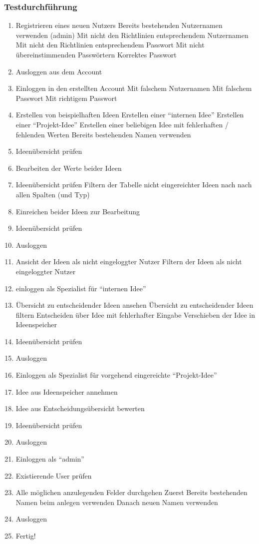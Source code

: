 \subsubsection*{Testdurchführung}
\begin{enumerate}
\item Registrieren eines neuen Nutzers
	\subitem Bereits bestehenden Nutzernamen verwenden (admin)
	\subitem Mit nicht den Richtlinien entsprechendem Nutzernamen
	\subitem Mit nicht den Richtlinien entsprechendem Passwort
	\subitem Mit nicht übereinstimmenden Passwörtern
	\subitem Korrektes Passwort
\item Ausloggen aus dem Account
\item Einloggen in den erstellten Account
	\subitem Mit falschem Nutzernamen
	\subitem Mit falschem Passwort
	\subitem Mit richtigem Passwort
\item Erstellen von beispielhaften Ideen
	\subitem Erstellen einer \enquote{internen Idee}
	\subitem Erstellen einer \enquote{Projekt-Idee}
	\subitem Erstellen einer beliebigen Idee mit fehlerhaften / fehlenden Werten
	\subitem Bereits bestehenden Namen verwenden
\item Ideenübersicht prüfen
\item Bearbeiten der Werte beider Ideen
\item Ideenübersicht prüfen
	\subitem Filtern der Tabelle nicht eingereichter Ideen nach nach allen Spalten (und Typ)
\item Einreichen beider Ideen zur Bearbeitung
\item Ideenübersicht prüfen
\item Ausloggen
\item Ansicht der Ideen als nicht eingeloggter Nutzer
	\subitem Filtern der Ideen als nicht eingeloggter Nutzer
\item einloggen als Spezialist für \enquote{internen Idee}
\item Übersicht zu entscheidender Ideen ansehen
	\subitem Übersicht zu entscheidender Ideen filtern
	\subitem Entscheiden über Idee mit fehlerhafter Eingabe
	\subitem Verschieben der Idee in Ideenspeicher
\item Ideenübersicht prüfen
\item Ausloggen
\item Einloggen als Spezialist für vorgehend eingereichte \enquote{Projekt-Idee}
\item Idee aus Ideenspeicher annehmen
\item Idee aus Entscheidungsübersicht bewerten
\item Ideenübersicht prüfen
\item Ausloggen
\item Einloggen als \enquote{admin}
\item Existierende User prüfen
\item Alle möglichen anzulegenden Felder durchgehen
 \subitem Zuerst Bereits bestehenden Namen beim anlegen verwenden
 \subitem Danach neuen Namen verwenden
\item Ausloggen
\item Fertig!
\end{enumerate}
